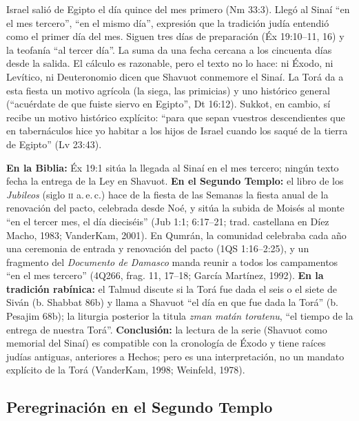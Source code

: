 \documentclass[11pt,letterpaper]{article}
\begin{document}
Israel salió de Egipto el día quince del mes primero (Nm 33:3). Llegó al Sinaí ``en el mes tercero'', ``en el mismo día'', expresión que la tradición judía entendió como el primer día del mes. Siguen tres días de preparación (Éx 19:10--11, 16) y la teofanía ``al tercer día''. La suma da una fecha cercana a los cincuenta días desde la salida. El cálculo es razonable, pero el texto no lo hace: ni Éxodo, ni Levítico, ni Deuteronomio dicen que Shavuot conmemore el Sinaí. La Torá da a esta fiesta un motivo agrícola (la siega, las primicias) y uno histórico general (``acuérdate de que fuiste siervo en Egipto'', Dt 16:12). Sukkot, en cambio, sí recibe un motivo histórico explícito: ``para que sepan vuestros descendientes que en tabernáculos hice yo habitar a los hijos de Israel cuando los saqué de la tierra de Egipto'' (Lv 23:43).

\begin{nota}
\textbf{En la Biblia:} Éx 19:1 sitúa la llegada al Sinaí en el mes tercero; ningún texto fecha la entrega de la Ley en Shavuot. \textbf{En el Segundo Templo:} el libro de los \emph{Jubileos} (siglo \textsc{ii} a.\,e.\,c.) hace de la fiesta de las Semanas la fiesta anual de la renovación del pacto, celebrada desde Noé, y sitúa la subida de Moisés al monte ``en el tercer mes, el día dieciséis'' (Jub 1:1; 6:17--21; trad. castellana en Díez Macho, 1983; VanderKam, 2001). En Qumrán, la comunidad celebraba cada año una ceremonia de entrada y renovación del pacto (1QS 1:16--2:25), y un fragmento del \emph{Documento de Damasco} manda reunir a todos los campamentos ``en el mes tercero'' (4Q266, frag. 11, 17--18; García Martínez, 1992). \textbf{En la tradición rabínica:} el Talmud discute si la Torá fue dada el seis o el siete de Siván (b. Shabbat 86b) y llama a Shavuot ``el día en que fue dada la Torá'' (b. Pesajim 68b); la liturgia posterior la titula \emph{zman matán toratenu}, ``el tiempo de la entrega de nuestra Torá''. \textbf{Conclusión:} la lectura de la serie (Shavuot como memorial del Sinaí) es compatible con la cronología de Éxodo y tiene raíces judías antiguas, anteriores a Hechos; pero es una interpretación, no un mandato explícito de la Torá (VanderKam, 1998; Weinfeld, 1978).
\end{nota}

\subsection{Peregrinación en el Segundo Templo}
\end{document}
